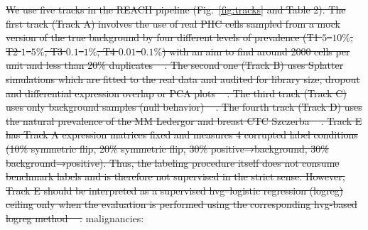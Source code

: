 \documentclass[10pt]{article}
\providecommand{\DIFaddtex}[1]{{\protect\color{trackgreen}#1}} %
\providecommand{\DIFdeltex}[1]{{\protect\color{red}\sout{#1}}}                      %
\providecommand{\DIFaddbegin}{} %
\providecommand{\DIFaddend}{} %
\providecommand{\DIFdelend}{} %
\providecommand{\DIFadd}[1]{\texorpdfstring{\DIFaddtex{#1}}{#1}} %
\providecommand{\DIFdel}[1]{\texorpdfstring{\DIFdeltex{#1}}{}} %
\newcommand{\DIFaddincludegraphics}[2][]{{\color{trackgreen}\fbox{\DIFOincludegraphics[#1]{#2}}}} %
\DeclareRobustCommand{\DIFaddbegin}{\DIFOaddbegin \let\includegraphics\DIFaddincludegraphics} %
\DeclareRobustCommand{\DIFaddend}{\DIFOaddend \let\includegraphics\DIFOincludegraphics} %
\DeclareRobustCommand{\DIFdelend}{\DIFOaddend \let\includegraphics\DIFOincludegraphics} %
\begin{document}
\DIFdel{We use five tracks in the REACH pipeline (Fig.~\ref{fig:tracks} and Table 2). The first track (Track A) involves the use of real PHC cells sampled from a mock version of the true background by four different levels of prevalence (T1 $5$--$10\%$, T2 $1$--$5\%$, T3 $0.1$--$1\%$, T4 $0.01$--$0.1\%$)  with an aim to find around 2000 cells per unit and less than 20\% duplicates \mbox{%
\cite{johnson2019survey,altalhan2025imbalanced}}\hskip0pt%
. The second one (Track B) uses Splatter simulations which are fitted to the real data and audited for library size, dropout and differential expression overlap or PCA plots \mbox{%
\cite{cao2021benchmark}}\hskip0pt%
. The third track (Track C) uses only background samples (null behavior) \mbox{%
\cite{torre2018rare}}\hskip0pt%
. The fourth track (Track D) uses the natural prevalence of the MM Ledergor and breast CTC Szczerba \mbox{%
\cite{peng2019single,qian2020pan}}\hskip0pt%
. Track E has Track A expression matrices fixed and measures 4 corrupted label conditions (10\% symmetric flip, 20\% symmetric flip, 30\% positive→background, 30\% background→positive). Thus, the labeling procedure itself does not consume benchmark labels and is therefore not supervised in the strict sense. However, Track E should be interpreted as a supervised hvg–logistic regression (logreg) ceiling only when the evaluation is performed using the corresponding hvg-based logreg method \mbox{%
\cite{mahalanabis2022evaluation}}\hskip0pt%
.
}\DIFdelend \DIFaddbegin \DIFadd{malignancies:
}\DIFaddend 
\end{document}
